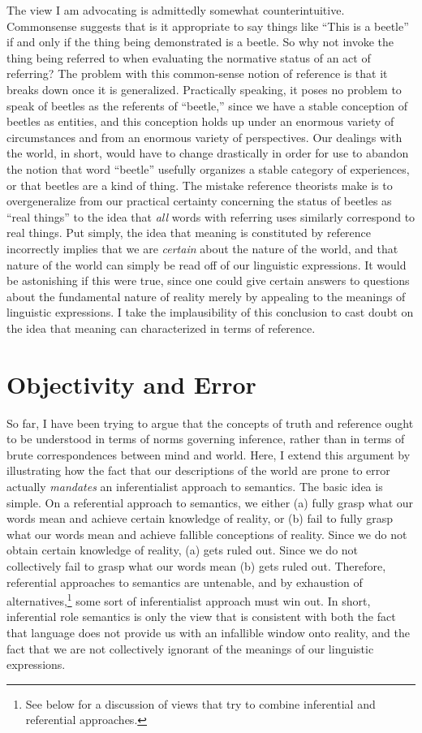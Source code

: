The view I am advocating is admittedly somewhat counterintuitive. Commonsense suggests that is it appropriate to say things like ``This is a beetle'' if and only if the thing being demonstrated is a beetle. So why not invoke the thing being referred to when evaluating the normative status of an act of referring? The problem with this common-sense notion of reference is that it breaks down once it is generalized. Practically speaking, it poses no problem to speak of beetles as the referents of ``beetle,'' since we have a stable conception of beetles as entities, and this conception holds up under an enormous variety of circumstances and from an enormous variety of perspectives. Our dealings with the world, in short, would have to change drastically in order for use to abandon the notion that word ``beetle'' usefully organizes a stable category of experiences, or that beetles are a kind of thing. The mistake reference theorists make is to overgeneralize from our practical certainty concerning the status of beetles as ``real things'' to the idea that \textit{all} words with referring uses similarly correspond to real things. Put simply, the idea that meaning is constituted by reference incorrectly implies that we are \textit{certain} about the nature of the world, and that nature of the world can simply be read off of our linguistic expressions. It would be astonishing if this were true, since one could give certain answers to questions about the fundamental nature of reality merely by appealing to the meanings of linguistic expressions. I take the implausibility of this conclusion to cast doubt on the idea that meaning can characterized in terms of reference. 

\section{Objectivity and Error}

So far, I have been trying to argue that the concepts of truth and reference ought to be understood in terms of norms governing inference, rather than in terms of brute correspondences between mind and world. Here, I extend this argument by illustrating how the fact that our descriptions of the world are prone to error actually \textit{mandates} an inferentialist approach to semantics. The basic idea is simple. On a referential approach to semantics, we either (a) fully grasp what our words mean and achieve certain knowledge of reality, or (b) fail to fully grasp what our words mean and achieve fallible conceptions of reality. Since we do not obtain certain knowledge of reality, (a) gets ruled out. Since we do not collectively fail to grasp what our words mean (b) gets ruled out. Therefore, referential approaches to semantics are untenable, and by exhaustion of alternatives,\footnote{See below for a discussion of views that try to combine inferential and referential approaches.} some sort of inferentialist approach must win out. In short, inferential role semantics is only the view that is consistent with both the fact that language does not provide us with an infallible window onto reality, and the fact that we are not collectively ignorant of the meanings of our linguistic expressions. 

